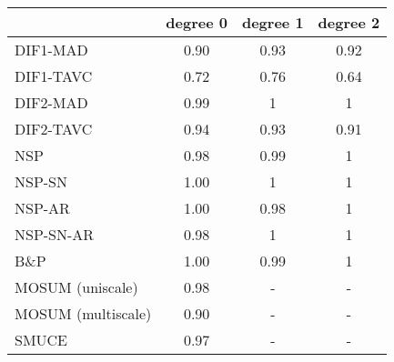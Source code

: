 \begin{tabular}{|l|c|c|c|}
  \hline
 & degree 0 & degree 1 & degree 2 \\ 
  \hline
DIF1-MAD & 0.90 & 0.93 & 0.92 \\ 
  DIF1-TAVC & 0.72 & 0.76 & 0.64 \\ 
  DIF2-MAD & 0.99 & 1 & 1 \\ 
  DIF2-TAVC & 0.94 & 0.93 & 0.91 \\ 
  NSP & 0.98 & 0.99 & 1 \\ 
  NSP-SN & 1.00 & 1 & 1 \\ 
  NSP-AR & 1.00 & 0.98 & 1 \\ 
  NSP-SN-AR & 0.98 & 1 & 1 \\ 
  B\&P & 1.00 & 0.99 & 1 \\ 
  MOSUM (uniscale) & 0.98 & - & - \\ 
  MOSUM (multiscale) & 0.90 & - & - \\ 
  SMUCE & 0.97 & - & - \\ 
   \hline
\end{tabular}
